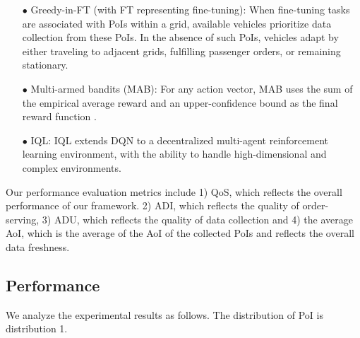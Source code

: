 \begin{itemize}
\item[$\bullet$] 
Greedy-in-FT (with FT representing fine-tuning): When fine-tuning tasks are associated with PoIs within a grid, available vehicles prioritize data collection from these PoIs. In the absence of such PoIs, vehicles adapt by either traveling to adjacent grids, fulfilling passenger orders, or remaining stationary.
\end{itemize}

\begin{itemize}
\item[$\bullet$] 
Multi-armed bandits (MAB): For any action vector, MAB uses the sum of the empirical average reward and an upper-confidence bound as the final reward function \cite{UCB}. 
\end{itemize}

\begin{itemize}
\item[$\bullet$] 
IQL: IQL extends DQN to a decentralized multi-agent reinforcement learning environment, with the ability to handle high-dimensional and complex environments.
\end{itemize}


Our performance evaluation metrics include 1) QoS, which reflects the overall performance of our framework. 2) ADI, which reflects the quality of order-serving, 3) ADU, which reflects the quality of data collection and 4) the average AoI, which is the average of the AoI of the collected PoIs and reflects the overall data freshness.

\subsection{Performance}
We analyze the experimental results as follows. The distribution of PoI is distribution 1.

